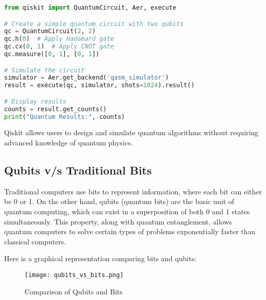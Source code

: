 \documentclass[12pt,a4paper]{article}
\begin{document}
\begin{tcolorbox}[title=Qiskit Example]
\begin{lstlisting}[language=Python]
from qiskit import QuantumCircuit, Aer, execute

# Create a simple quantum circuit with two qubits
qc = QuantumCircuit(2, 2)
qc.h(0)  # Apply Hadamard gate
qc.cx(0, 1)  # Apply CNOT gate
qc.measure([0, 1], [0, 1])

# Simulate the circuit
simulator = Aer.get_backend('qasm_simulator')
result = execute(qc, simulator, shots=1024).result()

# Display results
counts = result.get_counts()
print("Quantum Results:", counts)
\end{lstlisting}
\end{tcolorbox}

Qiskit allows users to design and simulate quantum algorithms without requiring advanced knowledge of quantum physics.

\subsection{Qubits v/s Traditional Bits}
Traditional computers use bits to represent information, where each bit can either be 0 or 1. On the other hand, qubits (quantum bits) are the basic unit of quantum computing, which can exist in a superposition of both 0 and 1 states simultaneously. This property, along with quantum entanglement, allows quantum computers to solve certain types of problems exponentially faster than classical computers.

Here is a graphical representation comparing bits and qubits:

\begin{figure}[h!]
    \centering
    \texttt{[image: qubits\_vs\_bits.png]}
    \caption{Comparison of Qubits and Bits}
    \label{fig:qubits_vs_bits}
\end{figure}
\newpage
\end{document}
